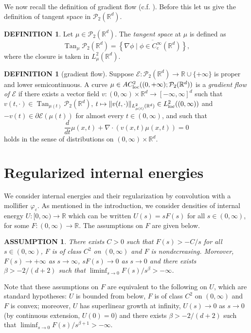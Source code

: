 \documentclass[11pt,leqno]{amsart}
\newtheorem{as}[thm]{ASSUMPTION}
\theoremstyle{definition}
\newtheorem{defi}[thm]{DEFINITION}
\newcommand{\bes}{\begin{equation*}}
\newcommand{\ees}{\end{equation*}}
\newcommand{\R}{{\mathord{\mathbb R}}}
\newcommand{\Rd}{{\mathord{\mathbb R}^d}}
\newcommand{\loc}{{\rm loc}}
\newcommand{\grad}{\nabla}
\def\P{{\mathcal P}}
\def\e{\varepsilon}
\newcommand{\E}{\mathcal{E}}
\DeclareMathOperator{\Tan}{Tan}
\begin{document}
We now recall the definition of gradient flow (c.f. \cite[Proposition 8.3.1, Definition 11.1.1]{AGS}). Before this let us give the definition of tangent space in $\P_2(\R^d)$.
\begin{defi}
	Let $\mu \in \P_2(\R^d)$. The \emph{tangent space} at $\mu$ is defined as
\bes
	\Tan_\mu \P_2(\R^d) = \overline{\left\{ \grad\phi \mid \phi \in C_\mathrm{c}^\infty(\R^d) \right\}},
\ees
where the closure is taken in $L^2_\mu(\R^d)$.
\end{defi}

\begin{defi}[gradient flow] \label{gradientflowdef}
	Suppose $\E\colon \P_2(\Rd) \to \R \cup \{+\infty\}$ is proper and lower semicontinuous. A curve $\mu \in AC^2_\loc((0,+\infty); \P_2(\Rd))$ is a \emph{gradient flow of $\E$} if there exists a vector field $v\colon (0,\infty)\times \R^d \to [-\infty,\infty]^d$ such that $v(t,\cdot)\in\Tan_{\mu(t)}\P_2(\R^d)$, $t\mapsto \|v(t,\cdot)\|_{L^2_{\mu(t)}(\R^d)} \in L^2_\loc((0,\infty))$ and $- v(t) \in \partial \E(\mu(t))$ for almost every $t\in(0,\infty)$, and such that 
\[ 
	\frac{d}{dt} \mu(x,t) + \grad \cdot (v(x,t) \mu(x,t)) = 0 
\]
holds in the sense of distributions on $(0,\infty)\times\R^d$.
\end{defi}

\section{Regularized internal energies}
We consider internal energies and their regularization by convolution with a mollifier $\varphi_\e$. As mentioned in the introduction, we consider densities of internal energy $U\colon [0,\infty) \to \R$ which can be written $U(s) = sF(s)$ for all $s\in(0,\infty)$, for some $F\colon (0,\infty) \to \R$. The assumptions on $F$ are given below.
\begin{as}\label{as:F}
	There exists $C>0$ such that $F(s) >-C/s$ for all $s\in(0,\infty)$, $F$ is of class $C^2$ on $(0,\infty)$ and $F$ is nondecreasing. Moreover, $F(s) \to +\infty$ as $s\to\infty$, $sF(s) \to 0$ as $s\to0$ and there exists $\beta > -2/(d+2)$ such that $\liminf_{s\to0} F(s) / s^\beta >-\infty$.
\end{as}
Note that these assumptions on $F$ are equivalent to the following on $U$, which are standard hypotheses: $U$ is bounded from below, $F$ is of class $C^2$ on $(0,\infty)$ and $F$ is convex; moreover, $U$ has superlinear growth at infinity, $U(s) \to 0$ as $s\to0$ (by continuous extension, $U(0) = 0$) and there exists $\beta > -2/(d+2)$ such that $\liminf_{s\to0} F(s) / s^{\beta+1} >-\infty$.
\end{document}

